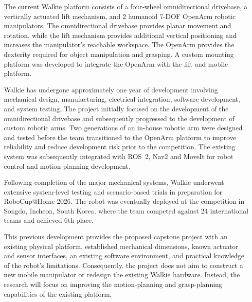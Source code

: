 \documentclass[12pt,a4paper]{article}
\newcommand{\figplaceholder}[2]{%
  \fbox{\begin{minipage}[c][#2][c]{#1}
    \centering \textit{[ Image placeholder ]}
  \end{minipage}}%
}
\begin{document}
The current Walkie platform consists of a four-wheel omnidirectional drivebase, a
vertically actuated lift mechanism, and 2 humanoid 7-DOF OpenArm robotic manipulators.
The omnidirectional drivebase provides planar movement and rotation, while the lift
mechanism provides additional vertical positioning and increases the manipulator's reachable
workspace. The OpenArm provides the dexterity required for object manipulation and grasping.
A custom mounting platform was developed to integrate the OpenArm with the lift and mobile
platform.


Walkie has undergone approximately one year of development involving mechanical
design, manufacturing, electrical integration, software development, and system testing. The
project initially focused on the development of the omnidirectional drivebase and subsequently
progressed to the development of custom robotic arms. Two generations of an in-house robotic
arm were designed and tested before the team transitioned to the OpenArm platform to
improve reliability and reduce development risk prior to the competition. The existing system
was subsequently integrated with ROS~2, Nav2 and MoveIt for robot control and
motion-planning development.

Following completion of the major mechanical systems, Walkie underwent extensive
system-level testing and scenario-based trials in preparation for RoboCup@Home 2026. The
robot was eventually deployed at the competition in Songdo, Incheon, South Korea, where the
team competed against 24 international teams and achieved 6th place.

This previous development provides the proposed capstone project with an existing
physical platform, established mechanical dimensions, known actuator and sensor interfaces, an
existing software environment, and practical knowledge of the robot's limitations.
Consequently, the project does not aim to construct a new mobile manipulator or redesign the
existing Walkie hardware. Instead, the research will focus on improving the motion-planning
and grasp-planning capabilities of the existing platform.
\end{document}

